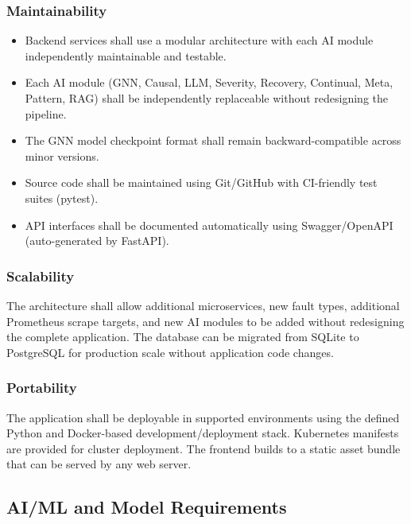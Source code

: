 \documentclass[11pt,a4paper]{article}
\begin{document}
\subsubsection{Maintainability}
\begin{itemize}
    \item Backend services shall use a modular architecture with each AI module independently maintainable and testable.
    \item Each AI module (GNN, Causal, LLM, Severity, Recovery, Continual, Meta, Pattern, RAG) shall be independently replaceable without redesigning the pipeline.
    \item The GNN model checkpoint format shall remain backward-compatible across minor versions.
    \item Source code shall be maintained using Git/GitHub with CI-friendly test suites (pytest).
    \item API interfaces shall be documented automatically using Swagger/OpenAPI (auto-generated by FastAPI).
\end{itemize}

\subsubsection{Scalability}
The architecture shall allow additional microservices, new fault types, additional Prometheus scrape targets, and new AI modules to be added without redesigning the complete application. The database can be migrated from SQLite to PostgreSQL for production scale without application code changes.

\subsubsection{Portability}
The application shall be deployable in supported environments using the defined Python and Docker-based development/deployment stack. Kubernetes manifests are provided for cluster deployment. The frontend builds to a static asset bundle that can be served by any web server.


\subsection{AI/ML and Model Requirements}
\end{document}
